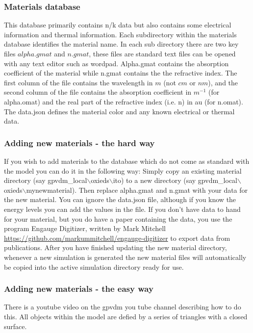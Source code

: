 \subsubsection{Materials database}
This database primarily contains n/k data but also contains some electrical information and thermal information. Each subdirectory within the materials database identifies the material name.  In each sub directory there are two key files $alpha.gmat$ and $n.gmat$, these files are standard text files can be opened with any text editor such as wordpad.    Alpha.gmat contains the absorption coefficient of the material while n.gmat contains the the refractive index.  The first column of the file contains the wavelength in $m$ (not $cm$ or $nm$), and the second column of the file contains the absorption coefficient in $m^{-1}$ (for alpha.omat) and the real part of the refractive index (i.e. n) in au (for n.omat). The data.json defines the material color and any known electrical or thermal data.


\subsubsection{Adding new materials - the hard way}
If you wish to add materials to the database which do not come as standard with the model you can do it in the following way:  Simply copy an existing material directory (say gpvdm\_local$\backslash$oxieds$\backslash$ito) to a new directory (say gpvdm\_local$\backslash$oxieds$\backslash$mynewmaterial).  Then replace alpha.gmat and n.gmat with your data for the new material. You can ignore the data.json file, although if you know the energy levels you can add the values in the file.
\newline
\newline
If you don't have data to hand for your material, but you do have a paper containing the data, you use the program Engauge Digitizer, written by  Mark Mitchell \url{https://github.com/markummitchell/engauge-digitizer} to export data from publications.  After you have finished updating the new material directory, whenever a new simulation is generated the new material files will automatically be copied into the active simulation directory ready for use. 

\subsubsection{Adding new materials - the easy way}
There is a youtube video on the gpvdm you tube channel describing how to do this. All objects within the model are defied by a series of triangles with a closed surface.

